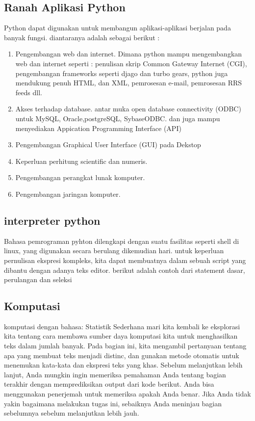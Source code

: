 \subsection{Ranah Aplikasi Python}
Python dapat digunakan untuk membangun aplikasi-aplikasi berjalan pada banyak fungsi. diantaranya adalah sebagai berikut :
\begin{enumerate}
\item Pengembangan web dan internet. Dimana python mampu mengembangkan web dan internet seperti : penulisan skrip Common Gateway Internet (CGI), pengembangan frameworks seperti djago dan turbo gears, python juga mendukung penuh HTML, dan XML, pemrosesan e-mail, pemrosesan RRS feeds dll.
\item Akses terhadap database. antar muka open database connectivity (ODBC) untuk MySQL, Oracle,postgreSQL, SybaseODBC. dan juga mampu menyediakan Appication Programming Interface (API)
\item Pengembangan Graphical User Interface (GUI) pada Dekstop
\item Keperluan perhitung scientific dan numeris.
\item Pengembangan perangkat lunak komputer.
\item Pengembangan jaringan komputer.
\end{enumerate}

\subsection{interpreter python}
Bahasa pemrograman pyhton dilengkapi dengan suatu fasilitas seperti shell di linux, yang digunakan secara berulang dikemudian hari. untuk keperluan pernulisan ekspresi kompleks, kita dapat membuatnya dalam sebuah script yang dibantu dengan adanya teks editor. berikut adalah contoh dari statement dasar, perulangan dan seleksi
 
\subsection{Komputasi}
komputasi dengan bahasa: Statistik Sederhana
mari kita kembali ke eksplorasi kita tentang cara membawa sumber daya komputasi kita untuk menghasilkan teks dalam jumlah banyak.
Pada bagian ini, kita mengambil pertanyaan tentang apa yang membuat teks menjadi distinc, dan gunakan metode otomatis untuk menemukan kata-kata dan ekspresi teks yang khas.
Sebelum melanjutkan lebih lanjut, Anda mungkin ingin memeriksa pemahaman Anda tentang bagian terakhir dengan memprediksikan output dari kode berikut. Anda bisa menggunakan penerjemah untuk memeriksa apakah Anda benar. Jika Anda tidak yakin bagaimana melakukan tugas ini, sebaiknya Anda meninjau bagian sebelumnya sebelum melanjutkan lebih jauh.

